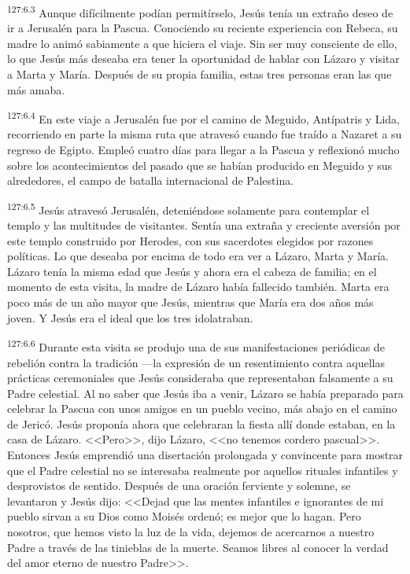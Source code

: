 \par 
\textsuperscript{127:6.3} Aunque difícilmente podían permitírselo, Jesús tenía un extraño deseo de ir a Jerusalén para la Pascua. Conociendo su reciente experiencia con Rebeca, su madre lo animó sabiamente a que hiciera el viaje. Sin ser muy consciente de ello, lo que Jesús más deseaba era tener la oportunidad de hablar con Lázaro y visitar a Marta y María. Después de su propia familia, estas tres personas eran las que más amaba.

\par 
\textsuperscript{127:6.4} En este viaje a Jerusalén fue por el camino de Meguido, Antípatris y Lida, recorriendo en parte la misma ruta que atravesó cuando fue traído a Nazaret a su regreso de Egipto. Empleó cuatro días para llegar a la Pascua y reflexionó mucho sobre los acontecimientos del pasado que se habían producido en Meguido y sus alrededores, el campo de batalla internacional de Palestina.

\par 
\textsuperscript{127:6.5} Jesús atravesó Jerusalén, deteniéndose solamente para contemplar el templo y las multitudes de visitantes. Sentía una extraña y creciente aversión por este templo construido por Herodes, con sus sacerdotes elegidos por razones políticas. Lo que deseaba por encima de todo era ver a Lázaro, Marta y María. Lázaro tenía la misma edad que Jesús y ahora era el cabeza de familia; en el momento de esta visita, la madre de Lázaro había fallecido también. Marta era poco más de un año mayor que Jesús, mientras que María era dos años más joven. Y Jesús era el ideal que los tres idolatraban.

\par 
\textsuperscript{127:6.6} Durante esta visita se produjo una de sus manifestaciones periódicas de rebelión contra la tradición ---la expresión de un resentimiento contra aquellas prácticas ceremoniales que Jesús consideraba que representaban falsamente a su Padre celestial. Al no saber que Jesús iba a venir, Lázaro se había preparado para celebrar la Pascua con unos amigos en un pueblo vecino, más abajo en el camino de Jericó. Jesús proponía ahora que celebraran la fiesta allí donde estaban, en la casa de Lázaro. <<Pero>>, dijo Lázaro, <<no tenemos cordero pascual>>. Entonces Jesús emprendió una disertación prolongada y convincente para mostrar que el Padre celestial no se interesaba realmente por aquellos rituales infantiles y desprovistos de sentido. Después de una oración ferviente y solemne, se levantaron y Jesús dijo: <<Dejad que las mentes infantiles e ignorantes de mi pueblo sirvan a su Dios como Moisés ordenó; es mejor que lo hagan. Pero nosotros, que hemos visto la luz de la vida, dejemos de acercarnos a nuestro Padre a través de las tinieblas de la muerte. Seamos libres al conocer la verdad del amor eterno de nuestro Padre>>.

